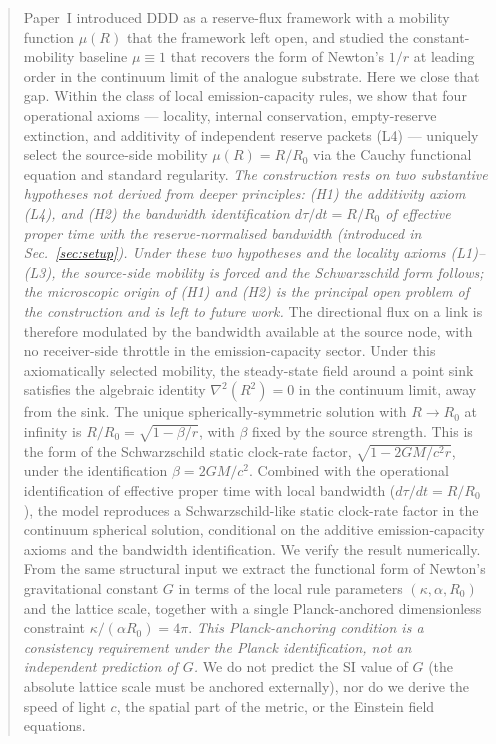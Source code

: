 \documentclass[11pt,a4paper]{article}
\begin{document}
\begin{abstract}
Paper~I introduced DDD as a reserve-flux framework with a
mobility function $\mu(R)$ that the framework left open, and
studied the constant-mobility baseline $\mu \equiv 1$ that
recovers the form of Newton's $1/r$ at leading order in the continuum limit of the analogue substrate. Here we close that gap.
Within the class of local emission-capacity rules, we show that
four operational axioms --- locality, internal conservation,
empty-reserve extinction, and additivity of independent reserve
packets (L4) --- uniquely select the source-side mobility
$\mu(R) = R/R_0$ via the Cauchy functional equation and standard
regularity. \emph{The construction rests on two substantive
hypotheses not derived from deeper principles: (H1) the
additivity axiom (L4), and (H2) the bandwidth identification
$d\tau/dt = R/R_0$ of effective proper time with the
reserve-normalised bandwidth (introduced in Sec.~\ref{sec:setup}).
Under these two hypotheses and the locality axioms (L1)--(L3),
the source-side mobility is forced and the Schwarzschild form
follows; the microscopic origin of (H1) and (H2) is the
principal open problem of the construction and is left to
future work.} The directional flux on a link is therefore modulated
by the bandwidth available at the source node, with no
receiver-side throttle in the emission-capacity sector. Under
this axiomatically selected mobility, the steady-state field
around a point sink satisfies the algebraic identity $\nabla^2(R^2) = 0$ in
the continuum limit, away from the sink. The unique
spherically-symmetric solution with $R \to R_0$ at infinity
is $R/R_0 = \sqrt{1 - \beta/r}$, with $\beta$ fixed by the
source strength. This is the form of the Schwarzschild static
clock-rate factor, $\sqrt{1 - 2GM/c^2 r}$, under the
identification $\beta = 2GM/c^2$. Combined with the
operational identification of effective proper time with local
bandwidth ($d\tau/dt = R/R_0$), the model reproduces a
Schwarzschild-like static clock-rate factor in the continuum
spherical solution, conditional on the additive
emission-capacity axioms and the bandwidth identification. We verify the result numerically.
From the same structural input we extract the functional form
of Newton's gravitational constant $G$ in terms of the local
rule parameters $(\kappa, \alpha, R_0)$ and the lattice scale,
together with a single Planck-anchored dimensionless constraint
$\kappa/(\alpha R_0) = 4\pi$. \emph{This Planck-anchoring
condition is a consistency requirement under the Planck
identification, not an independent prediction of $G$.} We do not
predict the SI value of
$G$ (the absolute lattice scale must be anchored externally),
nor do we derive the speed of light $c$, the spatial part of
the metric, or the Einstein field equations.
\end{abstract}
\end{document}
